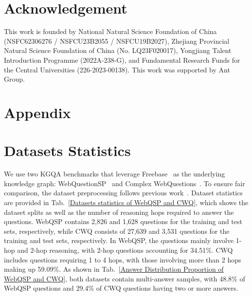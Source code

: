 \documentclass[11pt]{article}
\begin{document}
\section{Acknowledgement}

This work is founded by National Natural Science Foundation of China (NSFC62306276 / NSFCU23B2055 / NSFCU19B2027), Zhejiang Provincial Natural Science Foundation of China (No. LQ23F020017), Yongjiang Talent Introduction Programme (2022A-238-G), and Fundamental Research Funds for the Central Universities (226-2023-00138). This work was supported by Ant Group.



\section*{Appendix}
\label{sec:appendix}
\appendix
\section{Datasets Statistics}
\label{datastes statics}

We use two KGQA benchmarks that leverage Freebase~\cite{Bollacker2008FreebaseAC} as the underlying knowledge graph: WebQuestionSP~\cite{DBLP:conf/acl/YihRMCS16} and Complex WebQuestions~\cite{Talmor2018TheWA}. To ensure fair comparison, the dataset preprocessing follows previous work~\cite{luo2024reasoninggraphsfaithfulinterpretable}. Dataset statistics are provided in Tab.~\ref{Datasets statistics of WebQSP and CWQ}, which shows the dataset splits as well as the number of reasoning hops required to answer the questions. WebQSP contains 2,826 and 1,628 questions for the training and test sets, respectively, while CWQ consists of 27,639 and 3,531 questions for the training and test sets, respectively. In WebQSP, the questions mainly involve 1-hop and 2-hop reasoning, with 2-hop questions accounting for 34.51\%. CWQ includes questions requiring 1 to 4 hops, with those involving more than 2 hops making up 59.09\%. As shown in Tab.~\ref{Answer Distribution Proportion of WebQSP and CWQ}, both datasets contain multi-answer samples, with 48.8\% of WebQSP questions and 29.4\% of CWQ questions having two or more answers.

\begin{table}[H]
\caption{Datasets statistics of WebQSP and CWQ}
\label{Datasets statistics of WebQSP and CWQ}
\end{table}
\end{document}
